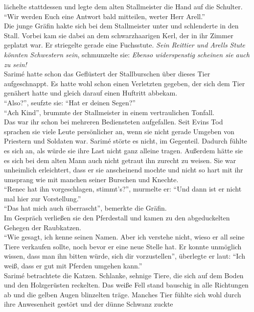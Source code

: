 lächelte stattdessen und legte dem alten Stallmeister die Hand auf die Schulter. ``Wir werden Euch 
eine Antwort bald mitteilen, werter Herr Arell.''\\
Die junge Gräfin hakte sich bei dem Stallmeister unter und schlenderte in den Stall. Vorbei kam sie 
dabei an dem schwarzhaarigen Kerl, der in ihr Zimmer geplatzt war. Er striegelte gerade eine 
Fuchsstute. \textit{Sein Reittier und Arells Stute könnten Schwestern sein}, schmunzelte sie: 
\textit{Ebenso widerspenstig scheinen sie auch zu sein!}\\
Sarimé hatte schon das Geflüstert der Stallburschen über dieses Tier aufgeschnappt. Es hatte wohl 
schon einen Verletzten gegeben, der sich dem Tier genähert hatte und gleich darauf einen Huftritt 
abbekam.\\
``Also?'', seufzte sie: ``Hat er deinen Segen?''\\
``Ach Kind'', brummte der Stallmeister in einem vertraulichen Tonfall.\\
Das war ihr schon bei mehreren Bediensteten aufgefallen. Seit Evins Tod sprachen sie viele Leute 
persönlicher an, wenn sie nicht gerade Umgeben von Priestern und Soldaten war. Sarimé störte es 
nicht, im Gegenteil. Dadurch fühlte es sich an, als würde sie ihre Last nicht ganz alleine tragen. 
Außerdem hätte sie es sich bei dem alten Mann auch nicht getraut ihn zurecht zu weisen. Sie war 
unheimlich erleichtert, dass er sie anscheinend mochte und nicht so hart mit ihr umsprang wie mit 
manchen seiner Burschen und Knechte.\\
``Renec hat ihn vorgeschlagen, stimmt's?'', murmelte er: ``Und dann ist er nicht mal hier zur
Vorstellung.''\\
``Das hat mich auch überrascht'', bemerkte die Gräfin.\\
Im Gespräch verließen sie den Pferdestall und kamen zu den abgeduckelten Gehegen der Raubkatzen.\\
``Wie gesagt, ich kenne seinen Namen. Aber ich verstehe nicht, wieso er all seine Tiere verkaufen 
sollte, noch bevor er eine neue Stelle hat. Er konnte unmöglich wissen, dass man ihn bitten würde, 
sich dir vorzustellen'', überlegte er laut: ``Ich weiß, dass er gut mit Pferden umgehen kann.''\\
Sarimé betrachtete die Katzen. Schlanke, sehnige Tiere, die sich auf dem Boden und den Holzgerüsten 
reckelten. Das weiße Fell stand bauschig in alle Richtungen ab und die gelben Augen blinzelten 
träge. Manches Tier fühlte sich wohl durch ihre Anwesenheit gestört und der dünne Schwanz zuckte 
